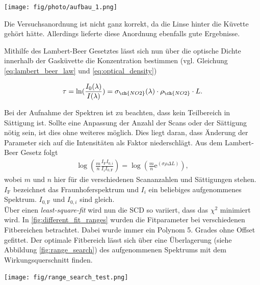 \documentclass[12pt, a4paper, bibliography=totoc]{scrartcl}
\begin{document}
\begin{multicols}{2}
\begin{center}
    \texttt{[image: fig/photo/aufbau\_1.png]}
    \label{fig:aufbau_hal}
\end{center}

Die Versuchsanordnung ist nicht ganz korrekt, da die Linse hinter die Küvette gehört hätte.
Allerdings lieferte diese Anordnung ebenfalls gute Ergebnisse.

Mithilfe des Lambert-Beer Gesetztes lässt sich nun über die optische Dichte innerhalb der Gasküvette die Konzentration bestimmen (vgl. Gleichung \eqref{eq:lambert_beer_law} und \eqref{eq:optical_density})

\begin{align}
\tau = \ln(\frac{I_0(\lambda)}{I(\lambda)}) = \sigma_{\ch{NO2}}(\lambda) \cdot \rho_{\ch{NO2}} \cdot L.
\end{align}

Bei der Aufnahme der Spektren ist zu beachten, dass kein Teilbereich in Sättigung ist.
Sollte eine Anpassung der Anzahl der Scans oder der Sättigung nötig sein, ist dies ohne weiteres möglich. 
Dies liegt daran, dass Änderung der Parameter sich auf die Intensitäten als Faktor niederschlägt. 
Aus dem Lambert-Beer Gesetz folgt
\begin{align}
    \log \left( \frac{m}{n} \frac{I_\text{F} I_{0, i}}{I_i I_{0, \text{F}}} \right) = \log \left(\frac{m}{n} \text{e}^{(\sigma \rho \Delta L)}\right) ,
\end{align}
wobei $m$ und $n$ hier für die verschiedenen Scananzahlen und Sättigungen stehen. 
$I_\text{F}$ bezeichnet das Fraunhoferspektrum und $I_i$ ein beliebiges aufgenommenes Spektrum.
$I_{0, \text{F}}$ und $I_{0, i}$ sind gleich.
\\
Über einen \textit{least-square-fit} wird nun die SCD so variiert, dass das $\chi^2$ minimiert wird. 
In \ref{fig:different_fit_ranges} wurden die Fitparameter bei verschiedenen Fitbereichen betrachtet. 
Dabei wurde immer ein Polynom 5. Grades ohne Offset gefittet.
Der optimale Fitbereich lässt sich über eine Überlagerung (siehe Abbildung \ref{fig:range_search}) des aufgenommenen Spektrums mit dem  Wirkungsquerschnitt finden.

\begin{center}
	\texttt{[image: fig/range\_search\_test.png]}
	\label{fig:range_search}
\end{center}


\end{multicols}
\end{document}
